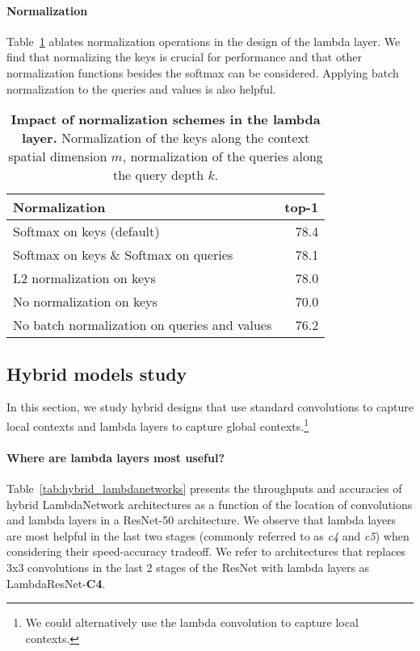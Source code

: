 \documentclass{article} \usepackage{iclr2021_conference,times}
\begin{document}
\vspace{-0.1cm}
\paragraph{Normalization\label{sec:normalization}}
Table~\ref{tab:normalization} ablates normalization operations in the design of the lambda layer.
We find that normalizing the keys is crucial for performance and that other normalization functions besides the softmax can be considered.
Applying batch normalization to the queries and values is also helpful.

\begin{table}[h]
  \begin{center}
  \small
  \begin{tabular}{lr}
    \toprule
    Normalization & top-1 \\
    \midrule
    Softmax on keys (default) & 78.4 \\
    Softmax on keys \& Softmax on queries & 78.1 \\
    L2 normalization on keys & 78.0 \\
    No normalization on keys & 70.0 \\
    \midrule
    No batch normalization on queries and values & 76.2 \\
    \bottomrule
  \end{tabular}
  \caption{
  \textbf{Impact of normalization schemes in the lambda layer.}
  Normalization of the keys along the context spatial dimension $m$, normalization of the queries along the query depth $k$.
  }
  \label{tab:normalization}
  \end{center}
\end{table}

\subsection{Hybrid models study}
In this section, we study hybrid designs that use standard convolutions to capture local contexts and lambda layers to capture global contexts.\footnote{We could alternatively use the lambda convolution to capture local contexts.}

\vspace{-0.1cm}
\paragraph{Where are lambda layers most useful?}
Table~\ref{tab:hybrid_lambdanetworks} presents the throughputs and accuracies of hybrid LambdaNetwork architectures as a function of the location of convolutions and lambda layers in a ResNet-50 architecture.
We observe that lambda layers are most helpful in the last two stages (commonly referred to as \emph{c4} and \emph{c5}) when considering their speed-accuracy tradeoff.
We refer to architectures that replaces 3x3 convolutions in the last 2 stages of the ResNet with lambda layers as LambdaResNet-\textbf{C4}.
\end{document}
